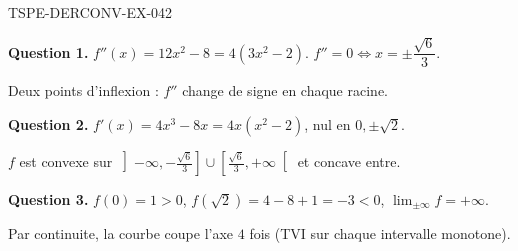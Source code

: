 \begin{corrige}{TSPE-DERCONV-EX-042}

\textbf{Question 1.} $f''(x) = 12x^2 - 8 = 4(3x^2-2)$. $f'' = 0 \iff x = \pm\dfrac{\sqrt{6}}{3}$.


Deux points d'inflexion : $f''$ change de signe en chaque racine.

\textbf{Question 2.} $f'(x) = 4x^3 - 8x = 4x(x^2-2)$, nul en $0, \pm\sqrt{2}$.

$f$ est convexe sur $\left]-\infty, -\frac{\sqrt6}{3}\right] \cup \left[\frac{\sqrt6}{3}, +\infty\right[$ et concave entre.

\textbf{Question 3.} $f(0)=1>0$, $f(\sqrt2) = 4-8+1 = -3 < 0$, $\lim_{\pm\infty} f = +\infty$.

Par continuite, la courbe coupe l'axe $4$ fois (TVI sur chaque intervalle monotone).

\end{corrige}

